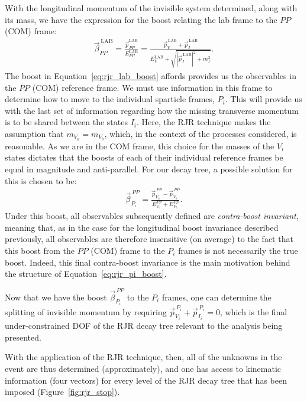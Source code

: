 With the longitudinal momentum of the invisible system determined, along with its mass, we have
the expression for the boost relating the lab frame to the $PP$ (COM) frame:
\begin{align}
    \vec{\beta}_{PP}^{\,\text{LAB}} = \frac{
        \vec{p}_{PP}^{\text{LAB}}
    }
    {
        E_{PP}^{\text{LAB}}
    }
    = \frac{
        \vec{p}_V^{\,\text{LAB}} + \vec{p}_I^{\,\text{LAB}}
    }
    {
        E_V^{\text{LAB}} + \sqrt{ |\vec{p}_I^{\,\text{LAB}} |^2 + m_I^2 }
    }.
    \label{eq:rjr_lab_boost}
\end{align}
The boost in Equation~\ref{eq:rjr_lab_boost} affords provides us the observables in the $PP$ (COM)
reference frame.
We must use information in this frame to determine how to move to the individual sparticle frames, $P_i$.
This will provide us with the last set of information regarding how the missing transverse momentum
is to be shared between the states $I_i$.
Here, the RJR technique makes the assumption that $m_{V_a} = m_{V_b}$, which, in the context of the processes
considered, is reasonable.
As we are in the COM frame, this choice for the masses of the $V_i$ states dictates that the boosts of each of their
individual reference frames be equal in magnitude and anti-parallel.
For our decay tree, a possible solution for this is chosen to be:
\begin{align}
    \vec{\beta}_{P_i}^{\,PP} = \frac{
        \vec{p}_{V_a}^{\,PP} - \vec{p}_{V_b}^{\,PP}
    }
    {
        E_{V_a}^{PP} + E_{V_b}^{PP}
    }.
    \label{eq:rjr_pi_boost}
\end{align}
Under this boost, all observables subsequently defined are \textit{contra-boost invariant}, meaning that,
as in the case for the longitudinal boost invariance described previously, all observables
are therefore insensitive (on average) to the fact that this boost from the $PP$ (COM) frame to the $P_i$
frames is not necessarily the true boost.
Indeed, this final contra-boost invariance is the main motivation behind the structure of Equation~\ref{eq:rjr_pi_boost}.

Now that we have the boost $\vec{\beta}_{P_i}^{\,PP}$ to the $P_i$ frames, one can determine the splitting of invisible
momentum by requiring $\vec{p}_{V_i}^{\,P_i} + \vec{p}_{I_i}^{\,P_i} = 0$, which
is the final under-constrained DOF of the RJR decay tree relevant to the analysis being presented.

With the application of the RJR technique, then, all of the unknowns in the event are thus determined
(approximately), and one has access to kinematic information (four vectors) for every level of the RJR decay tree
that has been imposed (Figure~\ref{fig:rjr_stop}).


